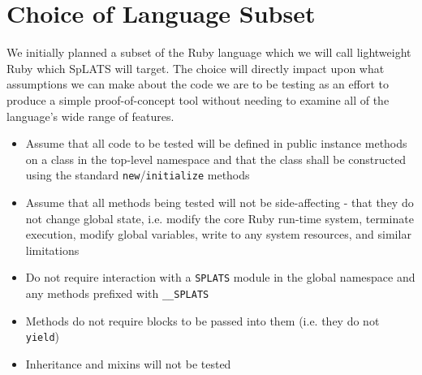 \section{Choice of Language Subset}
 We initially planned a subset of the Ruby language which we will call lightweight
Ruby which SpLATS will target. The choice will directly impact upon what
assumptions we can make about the code we are to be testing as an effort to
produce a simple proof-of-concept tool without needing to examine all of the
language's wide range of features.
\begin{itemize}
\item Assume that all code to be tested will be defined in public instance
methods on a class in the top-level namespace and that the class shall be
constructed using the standard \texttt{new}/\texttt{initialize} methods
\item Assume that all methods being tested will not be side-affecting - that
they do not change global state, i.e. modify the core Ruby run-time system, terminate
execution, modify global variables, write to any system resources, and similar
limitations
\item Do not require interaction with a \texttt{SPLATS} module in the global namespace
and any methods prefixed with \texttt{\_\_SPLATS}
\item Methods do not require blocks to be passed into them (i.e. they do not
\texttt{yield})
\item Inheritance and mixins will not be tested
\end{itemize}
